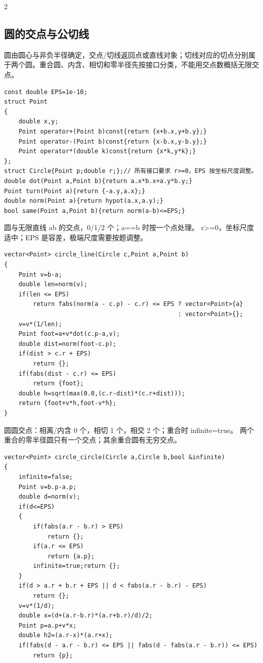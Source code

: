\documentclass[UTF8,fontset=fandol,a4paper,twoside]{ctexart}
\newcommand{\note}[1]{{\fontsize{10}{12}\selectfont #1\par}}
\begin{document}
\begin{multicols}{2}
\subsection{圆的交点与公切线}

\note{圆由圆心与非负半径确定，交点/\allowbreak{}切线返回点或直线对象；切线对应的切点分别属于两个圆。重合圆、内含、相切和零半径先按接口分类，不能用交点数概括无限交点。}
\begin{lstlisting}
const double EPS=1e-10;
struct Point
{
    double x,y;
    Point operator+(Point b)const{return {x+b.x,y+b.y};}
    Point operator-(Point b)const{return {x-b.x,y-b.y};}
    Point operator*(double k)const{return {x*k,y*k};}
};
struct Circle{Point p;double r;};// 所有接口要求 r>=0，EPS 按坐标尺度调整。
double dot(Point a,Point b){return a.x*b.x+a.y*b.y;}
Point turn(Point a){return {-a.y,a.x};}
double norm(Point a){return hypot(a.x,a.y);}
bool same(Point a,Point b){return norm(a-b)<=EPS;}
\end{lstlisting}
\note{圆与无限直线 ab 的交点，0/\allowbreak{}1/\allowbreak{}2 个；a=\allowbreak{}=\allowbreak{}b 时按一个点处理。 r>\allowbreak{}=\allowbreak{}0，坐标尺度适中；EPS 是容差，极端尺度需要按题调整。}
\begin{lstlisting}
vector<Point> circle_line(Circle c,Point a,Point b)
{
    Point v=b-a;
    double len=norm(v);
    if(len <= EPS)
        return fabs(norm(a - c.p) - c.r) <= EPS ? vector<Point>{a}
                                                : vector<Point>{};
    v=v*(1/len);
    Point foot=a+v*dot(c.p-a,v);
    double dist=norm(foot-c.p);
    if(dist > c.r + EPS)
        return {};
    if(fabs(dist - c.r) <= EPS)
        return {foot};
    double h=sqrt(max(0.0,(c.r-dist)*(c.r+dist)));
    return {foot+v*h,foot-v*h};
}
\end{lstlisting}
\note{圆圆交点：相离/\allowbreak{}内含 0 个，相切 1 个，相交 2 个；重合时 infinite=\allowbreak{}true。 两个重合的零半径圆只有一个交点；其余重合圆有无穷交点。}
\begin{lstlisting}
vector<Point> circle_circle(Circle a,Circle b,bool &infinite)
{
    infinite=false;
    Point v=b.p-a.p;
    double d=norm(v);
    if(d<=EPS)
    {
        if(fabs(a.r - b.r) > EPS)
            return {};
        if(a.r <= EPS)
            return {a.p};
        infinite=true;return {};
    }
    if(d > a.r + b.r + EPS || d < fabs(a.r - b.r) - EPS)
        return {};
    v=v*(1/d);
    double x=(d+(a.r-b.r)*(a.r+b.r)/d)/2;
    Point p=a.p+v*x;
    double h2=(a.r-x)*(a.r+x);
    if(fabs(d - a.r - b.r) <= EPS || fabs(d - fabs(a.r - b.r)) <= EPS)
        return {p};

\end{lstlisting}
\end{multicols}
\end{document}
